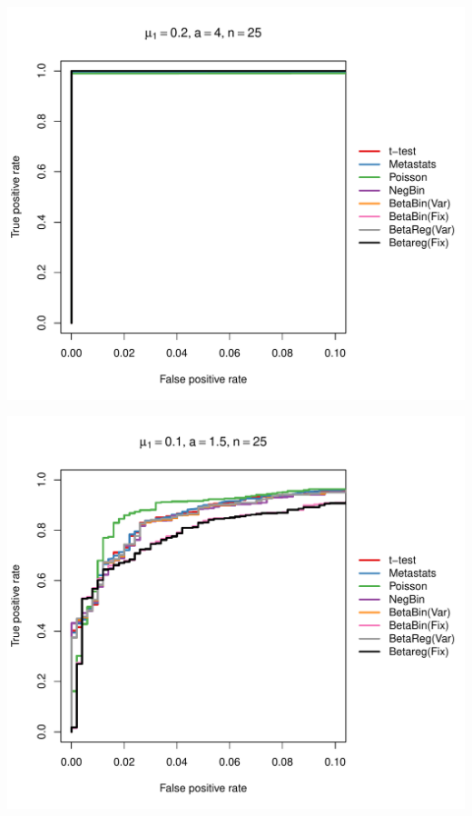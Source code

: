 \documentclass[12pt]{article}\usepackage{graphicx, color}
\makeatletter
\def\maxwidth{ %
  \ifdim\Gin@nat@width>\linewidth
    \linewidth
  \else
    \Gin@nat@width
  \fi
}
\newenvironment{knitrout}{}{} %
\makeatother
\begin{document}
\begin{knitrout}
{\centering \includegraphics[width=\maxwidth]{figure/rocs27} 

}




{\centering \includegraphics[width=\maxwidth]{figure/rocs28} 

}





\end{knitrout}
\end{document}
